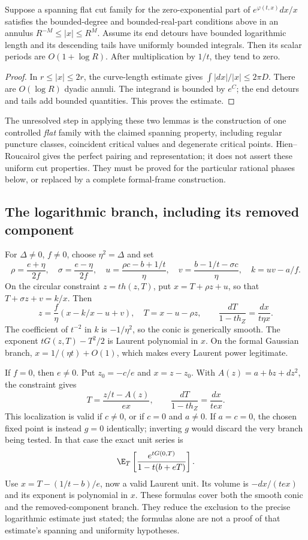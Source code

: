 \begin{lemma}\label{lem:conditionallog}
Suppose a spanning flat cut family for the zero-exponential part of
$e^{\varphi(t,x)}dx/x$ satisfies the bounded-degree and bounded-real-part
conditions above in an annulus $R^{-M}\leq|x|\leq R^M$. Assume its
end detours have bounded logarithmic length and its descending tails
have uniformly bounded integrals. Then its scalar periods are
$O(1+\log R)$. After multiplication by $1/t$, they tend to zero.
\end{lemma}
\begin{proof}
In $r\leq|x|\leq2r$, the curve-length estimate gives
$\int|dx|/|x|\leq2\pi D$. There are $O(\log R)$ dyadic annuli.
The integrand is bounded by $e^C$; the end detours and tails add
bounded quantities. This proves the estimate.
\end{proof}

The unresolved step in applying these two lemmas is the construction
of one controlled \emph{flat} family with the claimed spanning
property, including regular puncture classes, coincident critical
values and degenerate critical points. Hien--Roucairol gives the
perfect pairing and representation; it does not assert these uniform
cut properties. They must be proved for the particular rational
phases below, or replaced by a complete formal-frame construction.

\subsection{The logarithmic branch, including its removed component}

For $\Delta\ne0$, $f\ne0$, choose $\eta^2=\Delta$ and set
\[
 \rho=\frac{e+\eta}{2f},\quad \sigma=\frac{e-\eta}{2f},\quad
 u=\frac{\rho c-b+1/t}{\eta},\quad
 v=\frac{b-1/t-\sigma c}{\eta},\quad k=uv-a/f.
\]
On the circular constraint $z=th(z,T)$, put
$x=T+\rho z+u$, so that $T+\sigma z+v=k/x$. Then
\[
 z=\frac f\eta(x-k/x-u+v),\quad T=x-u-\rho z,
 \qquad
 \frac{dT}{1-th_Z}=\frac{dx}{t\eta x}.
\]
The coefficient of $t^{-2}$ in $k$ is $-1/\eta^2$, so the conic
is generically smooth. The exponent $tG(z,T)-T^2/2$ is Laurent
polynomial in $x$. On the formal Gaussian branch,
$x=1/(\eta t)+O(1)$, which makes every Laurent power legitimate.

If $f=0$, then $e\ne0$. Put $z_0=-c/e$ and $x=z-z_0$. With
$A(z)=a+bz+dz^2$, the constraint gives
\[
 T=\frac{z/t-A(z)}{ex},\qquad
 \frac{dT}{1-th_Z}=\frac{dx}{tex}.
\]
This localization is valid if $c\ne0$, or if $c=0$ and $a\ne0$.
If $a=c=0$, the chosen fixed point is instead $g=0$ identically;
inverting $g$ would discard the very branch being tested. In that
case the exact unit series is
\[
 \E_T\left[\frac{e^{tG(0,T)}}{1-t(b+eT)}\right].
\]
Use $x=T-(1/t-b)/e$, now a valid Laurent unit. Its volume is
$-dx/(tex)$ and its exponent is polynomial in $x$. These formulas
cover both the smooth conic and the removed-component branch.
They reduce the exclusion to the precise logarithmic estimate just
stated; the formulas alone are not a proof of that estimate's
spanning and uniformity hypotheses.

